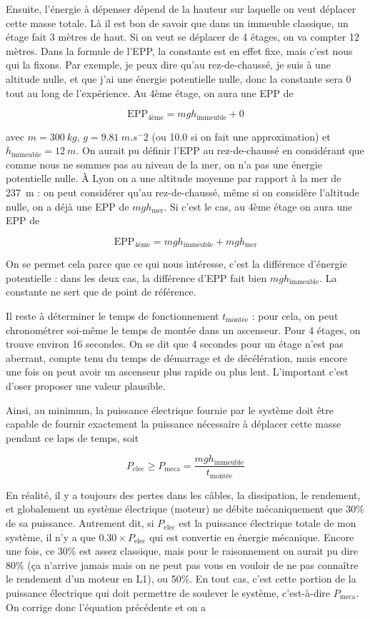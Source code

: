 \documentclass[10pt,a5paper,notitlepage]{book}
\begin{document}
Ensuite, l'énergie à dépenser dépend de la hauteur sur laquelle on veut déplacer
cette masse totale. Là il est bon de savoir que dans un immeuble classique, un
étage fait 3 mètres de haut. Si on veut se déplacer de 4 étages, on va compter
12 mètres. Dans la formule de l'EPP, la constante est en effet fixe, mais c'est
nous qui la fixons. Par exemple, je peux dire qu'au rez-de-chaussé, je suis à
une altitude nulle, et que j'ai une énergie potentielle nulle, donc la constante
sera 0 tout au long de l'expérience. Au 4ème étage, on aura une EPP de

\[\mathrm{EPP}_\mathrm{4ème} = mgh_\mathrm{immeuble} + 0\]

avec $m= \SI{300}{kg}$, $g= \SI{9.81}{m.s^-2}$ (ou 10.0 si on fait une
approximation) et $h_\mathrm{immeuble}= \SI{12}{m}$. On aurait pu définir l'EPP
au rez-de-chaussé en considérant que comme nous ne sommes pas au niveau de la
mer, on n'a pas une énergie potentielle nulle. À Lyon on a une altitude moyenne
par rapport à la mer de \SI{237}{m} : on peut considérer qu'au rez-de-chaussé,
même si on considère l'altitude nulle, on a déjà une EPP de $mgh_\mathrm{mer}$.
Si c'est le cas, au 4ème étage on aura une EPP de

\[\mathrm{EPP}_\mathrm{4ème} = mgh_\mathrm{immeuble} + mgh_\mathrm{mer}\]

On se permet cela parce que ce qui nous intéresse, c'est la différence d'énergie
potentielle : dans les deux cas, la différence d'EPP fait bien
$mgh_\mathrm{immeuble}$. La constante ne sert que de point de référence.

Il reste à déterminer le temps de fonctionnement $t_\mathrm{montée}$ : pour
cela, on peut chronométrer soi-même le temps de montée dans un ascenseur. Pour 4
étages, on trouve environ 16 secondes. On se dit que 4 secondes pour un étage
n'est pas aberrant, compte tenu du temps de démarrage et de décélération, mais
encore une fois on peut avoir un ascenseur plus rapide ou plus lent. L'important
c'est d'oser proposer une valeur plausible.

Ainsi, au minimum, la puissance électrique fournie par le système doit être
capable de fournir exactement la puissance nécessaire à déplacer cette masse
pendant ce laps de temps, soit

\[P_\mathrm{elec} \geq P_\mathrm{meca} =
\frac{mgh_\mathrm{immeuble}}{t_\mathrm{montée}}\]

En réalité, il y a toujours des pertes dans les câbles, la dissipation, le
rendement, et globalement un système électrique (moteur) ne débite mécaniquement
que 30\% de sa puissance. Autrement dit, si $P_\mathrm{elec}$ est la puissance
électrique totale de mon système, il n'y a que $0.30\times P_\mathrm{elec}$ qui
est convertie en énergie mécanique. Encore une fois, ce 30\% est assez
classique, mais pour le raisonnement on aurait pu dire 80\% (ça n'arrive jamais
mais on ne peut pas vous en vouloir de ne pas connaître le rendement d'un moteur
en L1), ou 50\%. En tout cas, c'est cette portion de la puissance électrique qui
doit permettre de soulever le système, c'est-à-dire $P_\mathrm{meca}$. On
corrige donc l'équation précédente et on a
\end{document}
